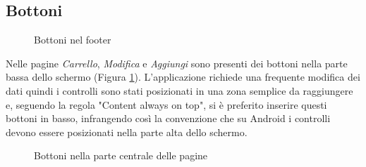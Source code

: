 \documentclass[12pt, a4paper, titlepage]{report}
\begin{document}
	\subsection{Bottoni}
	
	\begin{figure}[H] 
		\centering
		\hspace*{2cm}
		\caption{Bottoni nel footer}
		\label{fig:buttons}
	\end{figure}
	Nelle pagine \textit{Carrello}, \textit{Modifica} e \textit{Aggiungi} sono presenti dei bottoni nella parte bassa dello schermo (Figura \ref{fig:buttons}). L'applicazione richiede una frequente modifica dei dati quindi i controlli sono stati posizionati in una zona semplice da raggiungere e, seguendo la regola "Content always on top", si è preferito inserire questi bottoni in basso, infrangendo così la convenzione che su Android i controlli devono essere posizionati nella parte alta dello schermo. 
	\begin{figure}[H] 
		\centering
		\hspace*{1cm}
		\hspace*{1cm}
		\caption{Bottoni nella parte centrale delle pagine}
		\label{fig:item-buttons}
	\end{figure}
\end{document}
